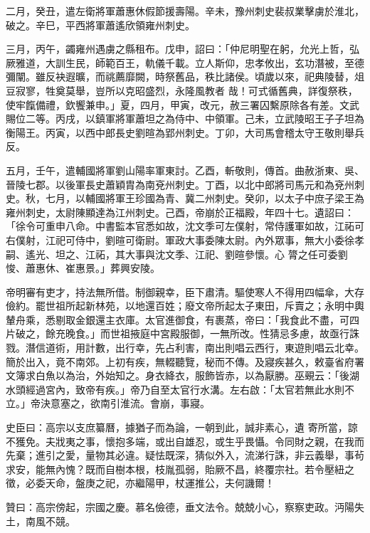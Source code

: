 \begin{pinyinscope}
 二月，癸丑，遣左衛將軍蕭惠休假節援壽陽。辛未，豫州刺史裴叔業擊虜於淮北，破之。辛巳，平西將軍蕭遙欣領雍州刺史。



 三月，丙午，蠲雍州遇虜之縣租布。戊申，詔曰：「仲尼明聖在躬，允光上哲，弘厥雅道，大訓生民，師範百王，軌儀千載。立人斯仰，忠孝攸出，玄功潛被，至德彌闡。雖反袂遐曠，而祧薦靡闕，時祭舊品，秩比諸侯。頃歲以來，祀典陵替，俎豆寂寥，牲奠莫舉，豈所以克昭盛烈，永隆風教者
 哉！可式循舊典，詳復祭秩，使牢餼備禮，欽饗兼申。」夏，四月，甲寅，改元，赦三署囚繫原除各有差。文武賜位二等。丙戌，以鎮軍將軍蕭坦之為侍中、中領軍。己未，立武陵昭王子子坦為衡陽王。丙寅，以西中郎長史劉暄為郢州刺史。丁卯，大司馬會稽太守王敬則舉兵反。



 五月，壬午，遣輔國將軍劉山陽率軍東討。乙酉，斬敬則，傳首。曲赦浙東、吳、晉陵七郡。以後軍長史蕭穎胄為南兗州刺史。丁酉，以北中郎將司馬元和為兗州刺史。秋，七月，以輔國將軍王珍國為青、冀二州刺史。癸卯，以太子中庶子梁王為雍州刺史，太尉陳顯達為江州刺史。己酉，帝崩於正福殿，年四十七。遺詔曰：「徐令可重申八命。中書監本官悉如故，沈文季可左僕射，常侍護軍如故，江祏可右僕射，江祀可侍中，劉暄可衛尉。軍政大事委陳太尉。內外眾事，無大小委徐孝嗣、遙光、坦之、江祏，其大事與沈文季、江祀、劉暄參懷。心
 膂之任可委劉悛、蕭惠休、崔惠景。」葬興安陵。



 帝明審有吏才，持法無所借。制御親幸，臣下肅清。驅使寒人不得用四幅傘，大存儉約。罷世祖所起新林苑，以地還百姓；廢文帝所起太子東田，斥賣之；永明中輿輦舟乘，悉剔取金銀還主衣庫。太官進御食，有裹蒸，帝曰：「我食此不盡，可四片破之，餘充晚食。」而世祖掖庭中宮殿服御，一無所改。性猜忌多慮，故亟行誅戮。潛信道術，用計數，出行幸，先占利害，南出則唱云西行，東遊則唱云北幸。簡於出入，竟不南郊。上初有疾，無輟聽覽，秘而不傳。及寢疾甚久，敕臺省府署文簿求白魚以為治，外始知之。身衣絳衣，服飾皆赤，以為厭勝。巫覡云：「後湖水頭經過宮內，致帝有疾。」帝乃自至太官行水溝。左右啟：「太官若無此水則不立。」帝決意塞之，欲南引淮流。會崩，事寢。



 史臣曰：高宗以支庶纂曆，據猶子而為論，一朝到此，誠非素心，遺
 寄所當，諒不獲免。夫戕夷之事，懷抱多端，或出自雄忍，或生乎畏懾。令同財之親，在我而先棄；進引之愛，量物其必違。疑怯既深，猜似外入，流涕行誅，非云義舉，事茍求安，能無內愧？既而自樹本根，枝胤孤弱，貽厥不昌，終覆宗社。若令壓紐之徵，必委天命，盤庚之祀，亦繼陽甲，杖運推公，夫何譏爾！



 贊曰：高宗傍起，宗國之慶。慕名儉德，垂文法令。兢兢小心，察察吏政。沔陽失土，南風不競。



\end{pinyinscope}